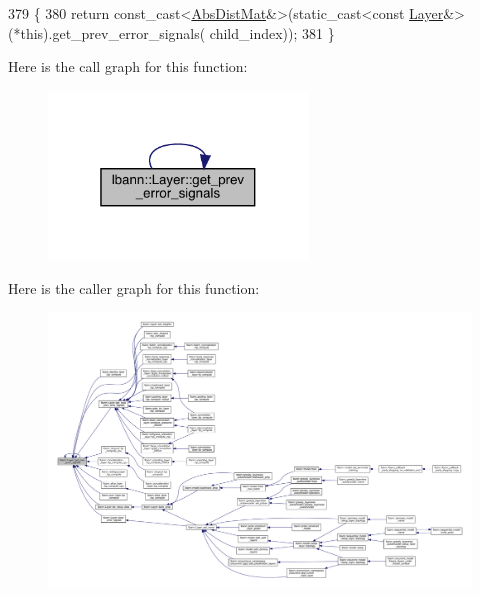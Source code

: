 \begin{DoxyCode}
379                                                          \{
380   \textcolor{keywordflow}{return} \textcolor{keyword}{const\_cast<}\hyperlink{base_8hpp_a9a697a504ae84010e7439ffec862b470}{AbsDistMat}&\textcolor{keyword}{>}(\textcolor{keyword}{static\_cast<}\textcolor{keyword}{const }\hyperlink{classlbann_1_1Layer_a24e9c82354a0a2af1b70cbca2211e7d4}{Layer}&\textcolor{keyword}{>}(*this).get\_prev\_error\_signals(
      child\_index));
381 \}
\end{DoxyCode}
Here is the call graph for this function\+:\nopagebreak
\begin{figure}[H]
\begin{center}
\leavevmode
\includegraphics[width=196pt]{classlbann_1_1Layer_a7ac4579d3c1671dfaf86e3b618d6938a_cgraph}
\end{center}
\end{figure}
Here is the caller graph for this function\+:\nopagebreak
\begin{figure}[H]
\begin{center}
\leavevmode
\includegraphics[width=350pt]{classlbann_1_1Layer_a7ac4579d3c1671dfaf86e3b618d6938a_icgraph}
\end{center}
\end{figure}
\mbox{\label{classlbann_1_1Layer_aff2c8983548364c978acb09ddf58a6fc}} 
